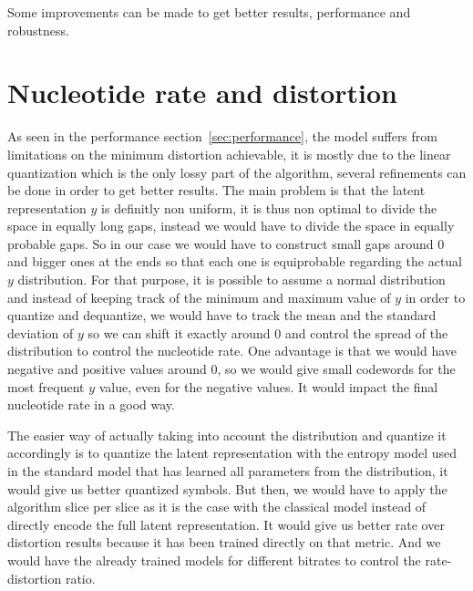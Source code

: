 

Some improvements can be made to get better results, performance and robustness. 

\section{Nucleotide rate and distortion}

As seen in the performance section~\ref{sec:performance}, the model suffers from limitations on the minimum distortion achievable, it is mostly due to the linear quantization which is the only lossy part of the algorithm, several refinements can be done in order to get better results. The main problem is that the latent representation $y$ is definitly non uniform, it is thus non optimal to divide the space in equally long gaps, instead we would have to divide the space in equally probable gaps. So in our case we would have to construct small gaps around $0$ and bigger ones at the ends so that each one is equiprobable regarding the actual $y$ distribution. 
For that purpose, it is possible to assume a normal distribution and instead of keeping track of the minimum and maximum value of $y$ in order to quantize and dequantize, we would have to track the mean and the standard deviation of $y$ so we can shift it exactly around $0$ and control the spread of the distribution to control the nucleotide rate. One advantage is that we would have negative and positive values around $0$, so we would give small codewords for the most frequent $y$ value, even for the negative values. It would impact the final nucleotide rate in a good way.

The easier way of actually taking into account the distribution and quantize it accordingly is to quantize the latent representation with the entropy model used in the standard model that has learned all parameters from the distribution, it would give us better quantized symbols. But then, we would have to apply the algorithm slice per slice as it is the case with the classical model instead of directly encode the full latent representation. It would give us better rate over distortion results because it has been trained directly on that metric. And we would have the already trained models for different bitrates to control the rate-distortion ratio.

